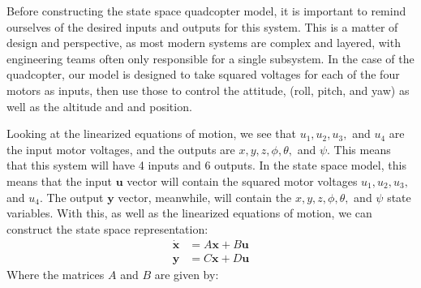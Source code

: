 \documentclass[12pt]{article}
\begin{document}
Before constructing the state space quadcopter model, it is important to remind ourselves 
of the desired inputs and outputs for this system. This is a matter of design and perspective,
as most modern systems are complex and layered, with engineering teams often only responsible
for a single subsystem. In the case of the quadcopter, our model is designed to take squared
voltages for each of the four motors as inputs, then use those to control the attitude, 
(roll, pitch, and yaw) as well as the altitude and and position. 
\par
Looking at the linearized equations of motion, we see that $u_1, u_2, u_3,$ and $u_4$ are the 
input motor voltages, and the outputs are $x,y,z,\phi,\theta,$ and $\psi$. This means that this 
system will have 4 inputs and 6 outputs. In the state space model, this means that the input $\textbf{u}$
vector will contain the squared motor voltages $u_1, u_2, u_3,$ and $u_4$. The output $\textbf{y}$ vector, 
meanwhile, will contain the $x,y,z,\phi,\theta,$ and $\psi$ state variables. With this, as well as the 
linearized equations of motion, we can construct the state space representation:
\begin{align*}
  \dot{\textbf{x}} &= A\textbf{x} + B\textbf{u} \\
  \textbf{y} &= C\textbf{x} + D\textbf{u} 
\end{align*}
Where the matrices $A$ and $B$ are given by:
\end{document}
